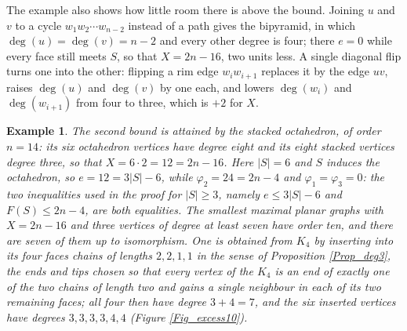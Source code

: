 \documentclass[10pt,a4paper]{article}
\newtheorem{example}[theorem]{Example}
\begin{document}
The example also shows how little room there is above the bound. Joining $u$ and $v$ to a cycle
$w_{1}w_{2}\cdots w_{n-2}$ instead of a path gives the bipyramid, in which $\deg (u)=\deg (v)=n-2$
and every other degree is four; there $e=0$ while every face still meets $S$, so that $X=2n-16$, two
units less.
A single diagonal flip turns one into the other: flipping a rim edge $w_{i}w_{i+1}$ replaces it by
the edge $uv$, raises $\deg (u)$ and $\deg (v)$ by one each, and lowers $\deg (w_{i})$ and
$\deg (w_{i+1})$ from four to three, which is $+2$ for $X$.

\begin{example}
\label{Ex_excess_second}
The second bound is attained by the stacked octahedron, of order $n=14$: its six octahedron vertices
have degree eight and its eight stacked vertices degree three, so that $X=6\cdot 2=12=2n-16$. Here
$|S|=6$ and $S$ induces the octahedron, so $e=12=3|S|-6$, while $\varphi _{2}=24=2n-4$ and
$\varphi _{1}=\varphi _{3}=0$: the two inequalities used in the proof for $|S|\geq 3$, namely
$e\leq 3|S|-6$ and $F(S)\leq 2n-4$, are both equalities.
The smallest maximal planar graphs with $X=2n-16$ and three vertices of degree at least seven have order
ten, and there are seven of them up to isomorphism. One is obtained from $K_{4}$ by inserting into
its four faces chains of lengths $2,2,1,1$ in the sense of Proposition \ref{Prop_deg3}, the ends and
tips chosen so that every vertex of the $K_{4}$ is an end of exactly one of the two chains of length
two and gains a single neighbour in each of its two remaining faces; all four then have degree
$3+4=7$, and the six inserted vertices have degrees $3,3,3,3,4,4$ (Figure \ref{Fig_excess10}).
\end{example}
\end{document}
